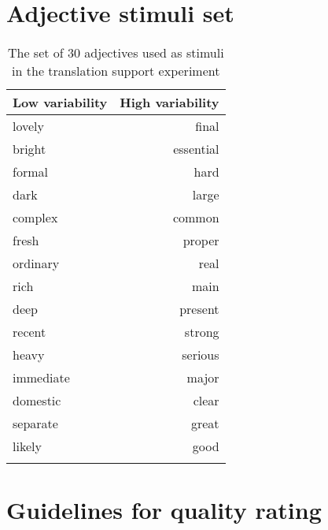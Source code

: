 \documentclass[output=paper]{LSP/langsci}
\begin{document}
\section{Adjective stimuli set}
\label{sec:kremer:adj-stimuli}
\begin{table}[hbp]
\begin{tabular*}{\textwidth}{@{\extracolsep{\fill}}lr@{}}
\lsptoprule
Low variability & High variability\\
\midrule
lovely    & final     \\     
bright    & essential \\ 
formal    & hard      \\      
dark      & large     \\     
complex   & common    \\    
fresh     & proper    \\    
ordinary  & real      \\      
rich      & main      \\      
deep      & present   \\   
recent    & strong    \\    
heavy     & serious   \\   
immediate & major     \\      
domestic  & clear     \\      
separate  & great     \\      
likely    & good      \\       
\lspbottomrule
\end{tabular*}
  \caption{The set of 30 adjectives used as stimuli in the translation support experiment}
  \label{tab:adjset}
\end{table}

\section{Guidelines for quality rating}
\label{sec:kremer:qr-guidelines}
\end{document}
